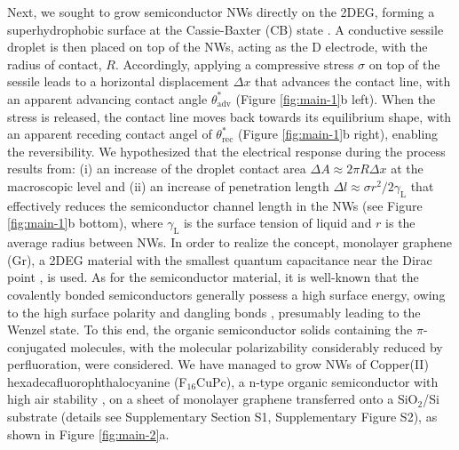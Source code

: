 \documentclass[journal=nalefd,manuscript=letter,email=true,hyperref=true,keywords=true]{achemso}
\begin{document}
Next, we sought to grow semiconductor NWs directly on the 2DEG,
forming a superhydrophobic surface at the Cassie-Baxter (CB) state
\cite{Cassie_1944}. A conductive sessile droplet is then placed on top
of the NWs, acting as the D electrode, with the radius of contact,
\(R\). Accordingly, applying a compressive stress \(\sigma\) on top
of the sessile leads to a horizontal displacement \(\Delta x\) that
advances the contact line, with an apparent advancing contact angle
\(\theta_{\mathrm{adv}}^{*}\) (Figure \ref{fig:main-1}b left). When the
stress is released, the contact line moves back towards its
equilibrium shape, with an apparent receding contact angel of
\(\theta_{\mathrm{rec}}^{*}\) (Figure \ref{fig:main-1}b right), enabling the
reversibility. We hypothesized that the electrical response during the
process results from: (i) an increase of the droplet contact area
\(\Delta A \approx 2 \pi R \Delta x\) at the macroscopic level and (ii)
an increase of penetration length \(\Delta l \approx \sigma
r^{2}/2\gamma_{\mathrm{L}}\) that effectively reduces the semiconductor
channel length in the NWs (see Figure  \ref{fig:main-1}b bottom), where
\(\gamma_{\mathrm{L}}\) is the surface tension of liquid and \(r\) is the
average radius between NWs.  In order to realize the concept,
monolayer graphene (Gr), a 2DEG material with the smallest quantum
capacitance near the Dirac point \cite{Tian_2016}, is used. As for the
semiconductor material, it is well-known that the covalently bonded
semiconductors generally possess a high surface energy, owing to the
high surface polarity \cite{Azimi_2013_wetting_RO} and dangling bonds
\cite{Zhang_2004_dangling}, presumably leading to the Wenzel state. To
this end, the organic semiconductor solids containing the
\(\pi\)-conjugated molecules, with the molecular polarizability
considerably reduced by perfluoration, were considered. We have
managed to grow NWs of Copper(II) hexadecafluorophthalocyanine
(F\(_{\text{16}}\)CuPc), a n-type organic semiconductor with high air stability
\cite{Bao_1998}, on a sheet of monolayer graphene transferred onto a
SiO\(_{\text{2}}\)/Si substrate (details see Supplementary Section S1,
Supplementary Figure S2), as shown in Figure \ref{fig:main-2}a.
\end{document}
